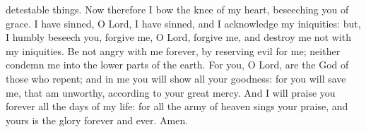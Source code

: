 {detestable things.
Now therefore I bow the knee of my heart, beseeching you of grace.
I have sinned, O Lord, I have sinned, and I acknowledge my iniquities:
but, I humbly beseech you, forgive me, O Lord, forgive me, and destroy me not with my iniquities. Be not angry with me forever, by reserving evil for me; neither condemn me into the lower parts of the earth. For you,
 O Lord, are the God of those who repent;
and in me you will show all your goodness: for you will save me, that am unworthy, according to your great mercy.
And I will praise you forever all the days of my life: for all the army of heaven sings your praise, and yours is the glory forever and ever. Amen.
\par }